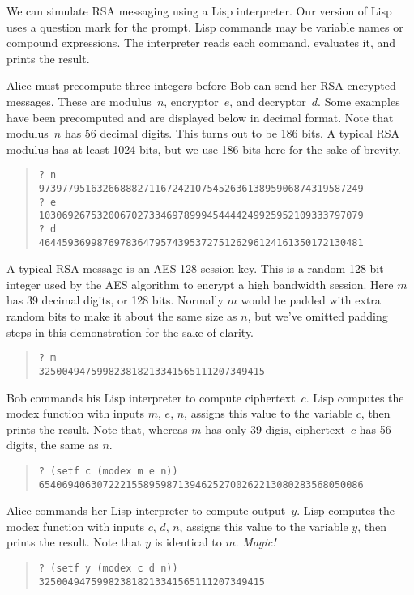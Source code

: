 
We can simulate RSA messaging using a Lisp interpreter.
Our version of Lisp uses a question mark for the prompt.
Lisp commands may be variable names or compound expressions.
The interpreter reads each command, evaluates it, and prints the result.

Alice must precompute three integers before Bob can send her RSA encrypted messages.
These are \mbox{modulus $n$}, \mbox{encryptor $e$}, and \mbox{decryptor $d$}.
Some examples have been precomputed and are displayed below in decimal format.
Note that \mbox{modulus $n$} has 56 decimal digits.  This turns out to be 186 bits.
A typical RSA modulus has at least 1024 bits, but we use 186 bits here for the sake of brevity.
\begin{quote}
\begin{verbatim}
? n
97397795163266888271167242107545263613895906874319587249
? e
10306926753200670273346978999454444249925952109333797079
? d
46445936998769783647957439537275126296124161350172130481
\end{verbatim}
\end{quote}

A typical RSA message is an AES-128 session key.
This is a random 128-bit integer used by the AES algorithm to encrypt a high bandwidth session.
Here $m$ has 39 decimal digits, or 128 bits.
Normally $m$ would be padded with extra random bits to make it about the same size as $n$,
but we've omitted padding steps in this demonstration for the sake of clarity.
\begin{quote}
\begin{verbatim}
? m
325004947599823818213341565111207349415
\end{verbatim}
\end{quote}

Bob commands his Lisp interpreter to compute \mbox{ciphertext $c$}.
Lisp computes the modex function with inputs $m$, $e$, $n$, 
assigns this value to the variable $c$, then prints the result.
Note that, whereas $m$ has only 39 digis, \mbox{ciphertext $c$} has 56 digits,
the same as $n$.
\begin{quote}
\begin{verbatim}
? (setf c (modex m e n))
65406940630722215589598713946252700262213080283568050086
\end{verbatim}
\end{quote}

Alice commands her Lisp interpreter to compute \mbox{output $y$}.
Lisp computes the modex function with inputs $c$, $d$, $n$, 
assigns this value to the variable $y$, then prints the result.
Note that $y$ is identical to $m$. \emph{Magic!}
\begin{quote}
\begin{verbatim}
? (setf y (modex c d n))
325004947599823818213341565111207349415
\end{verbatim}
\end{quote}

